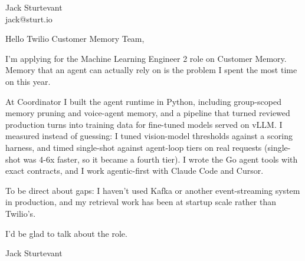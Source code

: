\documentclass[11pt]{article}
\begin{document}
\raggedright

{\namefont\fontsize{20pt}{24pt}\selectfont Jack Sturtevant}\\[-0.3em]
jack@sturt.io

\vspace{1.2em}

Hello Twilio Customer Memory Team,

I'm applying for the Machine Learning Engineer 2 role on Customer Memory. Memory that an agent can actually rely on is the problem I spent the most time on this year.

At Coordinator I built the agent runtime in Python, including group-scoped memory pruning and voice-agent memory, and a pipeline that turned reviewed production turns into training data for fine-tuned models served on vLLM. I measured instead of guessing: I tuned vision-model thresholds against a scoring harness, and timed single-shot against agent-loop tiers on real requests (single-shot was 4-6x faster, so it became a fourth tier). I wrote the Go agent tools with exact contracts, and I work agentic-first with Claude Code and Cursor.

To be direct about gaps: I haven't used Kafka or another event-streaming system in production, and my retrieval work has been at startup scale rather than Twilio's.

I'd be glad to talk about the role.

\vspace{0.6em}
Jack Sturtevant
\end{document}
